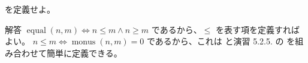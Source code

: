 \begin{jexercise*}[5.2.7]
   を定義せよ。
\end{jexercise*}
\begin{itembox}[l]{解答}
  $\operatorname{equal}(n, m) \iff n \leq m \land n \geq m$ であるから、$\leq$ を表す項を定義すればよい。
  $n \leq m \iff \operatorname{monus}(n, m) = 0$ であるから、これは  と演習 5.2.5. の  を組み合わせて簡単に定義できる。
\end{itembox}
